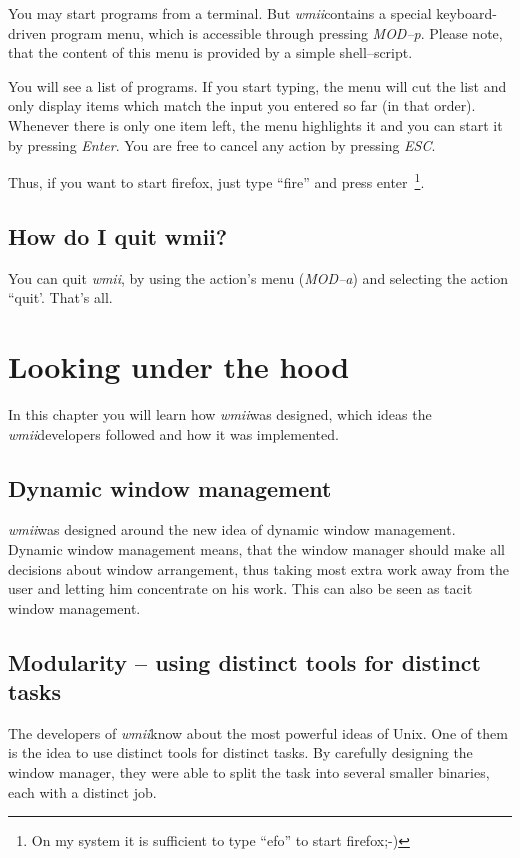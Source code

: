 \documentclass[12pt,a4paper]{article} %
\newcommand{\wmii}{\emph{wmii}}
\begin{document}
    You may start programs from a terminal. But \wmii contains a special
    keyboard-driven program menu, which is accessible through pressing
    \emph{MOD--p}. Please note, that the content of this menu is provided by a
    simple shell--script.

    You will see a list of programs. If you start typing, the
    menu will cut the list and only display items which match
    the input you entered so far (in that order). Whenever there is
    only one item left, the menu highlights it and you can start it
    by pressing \emph{Enter}. You are free to cancel any action by
    pressing \emph{ESC}.

    Thus, if you want to start firefox, just type ``fire'' and press
    enter~\footnote{On my system it is sufficient to type ``efo'' to
      start firefox;-)}.

    \subsection{How do I quit wmii?}
    You can quit \wmii, by using the action's menu (\emph{MOD--a})
    and selecting the action ``quit'. That's all.
    
    \section{Looking under the hood}

    In this chapter you will learn how \wmii was designed, which ideas
    the \wmii developers followed and how it was implemented.

    \subsection{Dynamic window management}

    \wmii was designed around the new idea of dynamic window management.
    Dynamic window management means, that the window manager should make all
    decisions about window arrangement, thus taking most extra work away
    from the user and letting him concentrate on his work. This can also be
    seen as tacit window management.

    \subsection{Modularity -- using distinct tools for distinct tasks}

    The developers of \wmii know about the most powerful ideas of
    Unix. One of them is the idea to use distinct tools for distinct
    tasks. By carefully designing the window manager, they were able to
    split the task into several smaller binaries, each with a distinct
    job.
    
\end{document}
